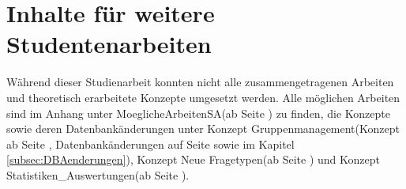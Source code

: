 \section{Inhalte für weitere Studentenarbeiten}
\label{sec:InhalteFuerStudentenarbeiten}

Während dieser Studienarbeit konnten nicht alle zusammengetragenen Arbeiten und theoretisch erarbeitete Konzepte umgesetzt werden. Alle möglichen Arbeiten sind im Anhang unter \glqq MoeglicheArbeitenSA\grqq (ab Seite \hyperlink{page.\getpagerefnumber{pdf:moeglicheArbeiten}}{}) zu finden, die Konzepte sowie deren Datenbankänderungen unter \glqq Konzept Gruppenmanagement\grqq (Konzept ab Seite \hyperlink{page.\getpagerefnumber{pdf:gruppenadmin}}{}, Datenbankänderungen auf Seite \hyperlink{page.\getpagerefnumber{pdf:dbgruppenadmin}}{} sowie im Kapitel \ref{subsec:DBAenderungen}), \glqq Konzept Neue Fragetypen\grqq (ab Seite \hyperlink{page.\getpagerefnumber{pdf:konzeptFragen}}{}) und \glqq Konzept Statistiken\_Auswertungen\grqq (ab Seite \hyperlink{page.\getpagerefnumber{pdf:konzeptStatistiken}}{}).
		


